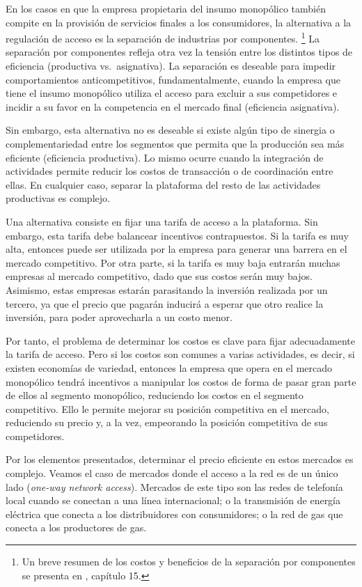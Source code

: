 \documentclass[
  12pt,
  spanish,
]{book}
\begin{document}
En los casos en que la empresa propietaria del insumo monopólico también
compite en la provisión de servicios finales a los consumidores, la
alternativa a la regulación de acceso es la separación de industrias por
componentes. \footnote{Un breve resumen de los costos y beneficios de la
  separación por componentes se presenta en \citet{Viscusi2005},
  capítulo 15.} La separación por componentes refleja otra vez la
tensión entre los distintos tipos de eficiencia (productiva
vs.~asignativa). La separación es deseable para impedir comportamientos
anticompetitivos, fundamentalmente, cuando la empresa que tiene el
insumo monopólico utiliza el acceso para excluir a sus competidores e
incidir a su favor en la competencia en el mercado final (eficiencia
asignativa).

Sin embargo, esta alternativa no es deseable si existe algún tipo de
sinergia o complementariedad entre los segmentos que permita que la
producción sea más eficiente (eficiencia productiva). Lo mismo ocurre
cuando la integración de actividades permite reducir los costos de
transacción o de coordinación entre ellas. En cualquier caso, separar la
plataforma del resto de las actividades productivas es complejo.

Una alternativa consiste en fijar una tarifa de acceso a la plataforma.
Sin embargo, esta tarifa debe balancear incentivos contrapuestos. Si la
tarifa es muy alta, entonces puede ser utilizada por la empresa para
generar una barrera en el mercado competitivo. Por otra parte, si la
tarifa es muy baja entrarán muchas empresas al mercado competitivo, dado
que sus costos serán muy bajos. Asimismo, estas empresas estarán
parasitando la inversión realizada por un tercero, ya que el precio que
pagarán inducirá a esperar que otro realice la inversión, para poder
aprovecharla a un costo menor.

Por tanto, el problema de determinar los costos es clave para fijar
adecuadamente la tarifa de acceso. Pero si los costos son comunes a
varias actividades, es decir, si existen economías de variedad, entonces
la empresa que opera en el mercado monopólico tendrá incentivos a
manipular los costos de forma de pasar gran parte de ellos al segmento
monopólico, reduciendo los costos en el segmento competitivo. Ello le
permite mejorar su posición competitiva en el mercado, reduciendo su
precio y, a la vez, empeorando la posición competitiva de sus
competidores.

Por los elementos presentados, determinar el precio eficiente en estos
mercados es complejo. Veamos el caso de mercados donde el acceso a la
red es de un único lado (\emph{one-way network access}). Mercados de
este tipo son las redes de telefonía local cuando se conectan a una
línea internacional; o la transmisión de energía eléctrica que conecta a
los distribuidores con consumidores; o la red de gas que conecta a los
productores de gas.
\end{document}
